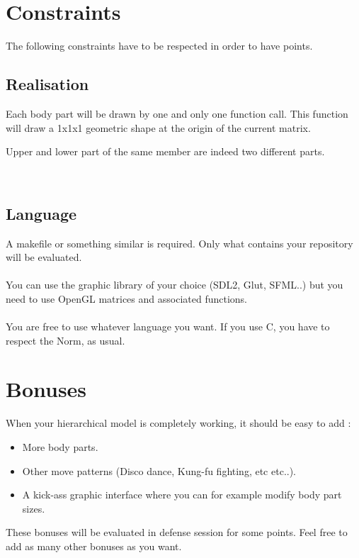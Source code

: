 \documentclass{42}
\begin{document}
\section{Constraints}
	The following constraints have to be respected in order to have points.
\newline
\subsection{Realisation}
	Each body part will be drawn by one and only one function call. This function will draw a 1x1x1 geometric shape at the origin of the current matrix.

\info
{
	Upper and lower part of the same member are indeed two different parts.
}

\
\subsection{Language}
A makefile or something similar is required. Only what contains your repository will be evaluated.\\
\\
\indent You can use the graphic library of your choice (SDL2, Glut, SFML..) but you need to use OpenGL matrices and associated functions.\\
\\
\indent You are free to use whatever language you want. If you use C, you have to respect the Norm, as usual.\\

\newpage
\section{Bonuses}

When your hierarchical model is completely working, it should be easy to add :\\
\begin{itemize}
	\item More body parts.
	\item Other move patterns (Disco dance, Kung-fu fighting, etc etc..).
	\item A kick-ass graphic interface where you can for example modify body part sizes.
\end{itemize}
\newline
These bonuses will be evaluated in defense session for some points.
Feel free to add as many other bonuses as you want.\\
\\
\end{document}
